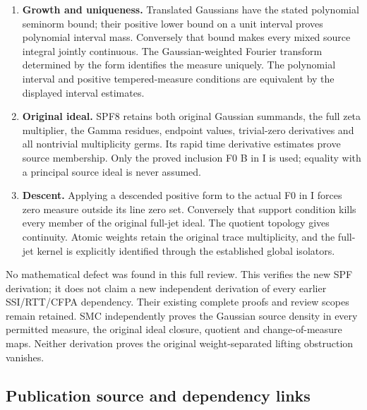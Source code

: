 \begin{enumerate}
  has exactly equal Gram matrices. Finite-measure Fourier uniqueness
  gives dense range. Multiplication by exp(-lambda squared) transports
  L2(nu) isometrically onto L2(exp(2 lambda squared)nu), with the
  specified inverse and domains. The original source vector then maps to
  its actual line values. This proves the entire receiver is
  represented, including possible continuous measure.
\item
  \textbf{Growth and uniqueness.} Translated Gaussians have the stated
  polynomial seminorm bound; their positive lower bound on a unit
  interval proves polynomial interval mass. Conversely that bound makes
  every mixed source integral jointly continuous. The Gaussian-weighted
  Fourier transform determined by the form identifies the measure
  uniquely. The polynomial interval and positive tempered-measure
  conditions are equivalent by the displayed interval estimates.
\item
  \textbf{Original ideal.} SPF8 retains both original Gaussian summands,
  the full zeta multiplier, the Gamma residues, endpoint values,
  trivial-zero derivatives and all nontrivial multiplicity germs. Its
  rapid time derivative estimates prove source membership. Only the
  proved inclusion F0 B in I is used; equality with a principal source
  ideal is never assumed.
\item
  \textbf{Descent.} Applying a descended positive form to the actual F0
  in I forces zero measure outside its line zero set. Conversely that
  support condition kills every member of the original full-jet ideal.
  The quotient topology gives continuity. Atomic weights retain the
  original trace multiplicity, and the full-jet kernel is explicitly
  identified through the established global isolators.
\end{enumerate}

No mathematical defect was found in this full review. This verifies the
new SPF derivation; it does not claim a new independent derivation of
every earlier SSI/RTT/CFPA dependency. Their existing complete proofs
and review scopes remain retained. SMC independently proves the Gaussian
source density in every permitted measure, the original ideal closure,
quotient and change-of-measure maps. Neither derivation proves the
original weight-separated lifting obstruction vanishes.

\subsection{Publication source and dependency
links}\label{publication-source-and-dependency-links}

